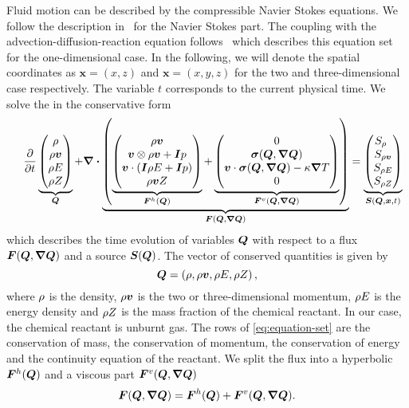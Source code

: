 Fluid motion can be described by the compressible Navier Stokes equations.
We follow the description in~\cite{dumbser2010arbitrary} for the Navier Stokes part.
The coupling with the advection-diffusion-reaction equation follows~\cite{hidalgo2011ader} which describes this equation set for the one-dimensional case.
In the following, we will denote the spatial coordinates as $\bm{x} = \left( x,z \right)$ and $\bm{x} = \left( x,y,z \right)$ for the two and three-dimensional case respectively.
The variable $t$ corresponds to the current physical time.
We solve the \pde{} in the conservative form%
\begin{equation}
 \label{eq:equation-set} 
\quad
  \pdv{}{t}
  \underbrace{
  \begin{pmatrix}
    \Qrho\\
    \Qj\\
    \QE\\
    \QZ
    \end{pmatrix}}_{\Q}
  +
  \divergence{
  \underbrace{
  \left(
   \underbrace{\hyperFluxDef}_{\hyperFlux(\Q)}
+
\underbrace{\viscFluxDef}_{\viscFlux(\Q, \gradQ)}
  \right)}_{\flux(\Q, \gradQ)}}
 =
  \underbrace{
  \begin{pmatrix}
    \source[\Qrho\phantom{\Qrho}]\\
    \source[\Qj]\\
    \source[\QE]\\
    \source[\QZ]
    \end{pmatrix}}_{\source(\Q, \bm{x}, t)}
\end{equation}
which describes the time evolution of variables $\bm{Q}$ with respect to a flux $\flux(\Q, \gradQ)$ and a source $\source(\Q)$.
The vector of conserved quantities is given by
\begin{equation}
  \label{eq:conserved-variables}
 \bm{Q} = \left( \rho, \rho \bm{v}, \rho E, \rho Z \right),
\end{equation}
where $\rho$ is the density, $\rho \bm{v}$ is the two or three-dimensional momentum, $\rho E$ is the energy density and $\rho Z$ is the mass fraction of the chemical reactant.
In our case, the chemical reactant is unburnt gas.
The rows of \cref{eq:equation-set} are the conservation of mass, the conservation of momentum, the conservation of energy and the continuity equation of the reactant.
We split the flux into a hyperbolic $\bm{F}^{h}(\bm{Q})$ and a viscous part $\viscFlux(\Q, \gradQ)$
\begin{equation}
  \label{eq:flux}
  \flux(\Q, \gradQ) = \hyperFlux(\Q) + \viscFlux(\Q, \gradQ).
\end{equation}

